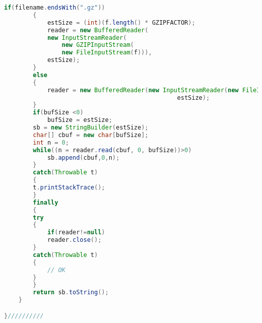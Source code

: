 \begin{lstlisting}[language=Java]
		if(filename.endsWith(".gz"))
		{
		    estSize = (int)(f.length() * GZIPFACTOR);
		    reader = new BufferedReader(
			new InputStreamReader(
			    new GZIPInputStream(
				new FileInputStream(f))), 
			estSize);
		}
		else
		{
		    reader = new BufferedReader(new InputStreamReader(new FileInputStream(f)), 
                                                estSize);
		}
		if(bufSize <0)
		    bufSize = estSize;
		sb = new StringBuilder(estSize);
		char[] cbuf = new char[bufSize];
		int n = 0;
		while((n = reader.read(cbuf, 0, bufSize))>0)
		    sb.append(cbuf,0,n);
	    }
	    catch(Throwable t)
	    {
		t.printStackTrace();
	    }
	    finally
	    {
		try
		{
		    if(reader!=null)
			reader.close();
		}
		catch(Throwable t)
		{
		    // OK
		}
	    }
	    return sb.toString();
	}

}//////////

\end{lstlisting}

